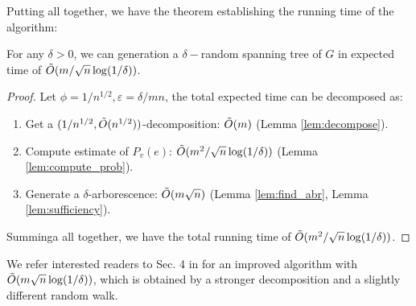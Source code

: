 Putting all together, we have the theorem establishing the running time of the algorithm:
\begin{theorem}
    For any $\delta>0$, we can generation a $\delta-$random spanning tree of $G$ in expected time of $\tilde{O}(m/\sqrt{n}\log(1/\delta))$.
\end{theorem}
\begin{proof}
    Let $\phi=1/n^{1/2}, \varepsilon=\delta/mn$, the total expected time can be decomposed as:
    \begin{enumerate}
        \item Get a $(1/n^{1/2}, \tilde{O}(n^{1/2}))$-decomposition: $\tilde{O}(m)$ (Lemma \ref{lem:decompose}).
        \item Compute estimate of $P_v(e)$: $\tilde{O}(m^2/\sqrt{n}\log(1/\delta))$ (Lemma \ref{lem:compute_prob}).
        \item Generate a $\delta$-arborescence: $\tilde{O}(m\sqrt{n})$ (Lemma \ref{lem:find_abr}, Lemma \ref{lem:sufficiency}).
    \end{enumerate}
    Summinga all together, we have the total running time of $ \tilde{O}(m^2/\sqrt{n}\log(1/\delta))$.
\end{proof}

We refer interested readers to Sec. 4 in \cite{kelner2009faster} for an improved algorithm with $\tilde{O}(m\sqrt{n}\log(1/\delta))$, which is obtained by a stronger decomposition and a slightly different random walk.


